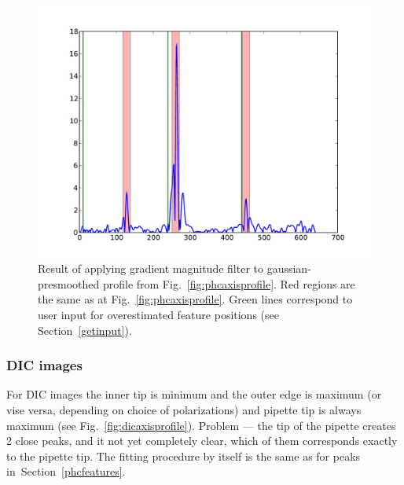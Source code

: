 \documentclass[a4paper,12pt]{article}
\begin{document}
\begin{figure}%
\includegraphics[width=\columnwidth]{figs/phcprofilegrad.pdf}%
\caption{Result of applying gradient magnitude filter to gaussian-presmoothed profile from Fig.~\ref{fig:phcaxisprofile}. Red regions are the same as at Fig.~\ref{fig:phcaxisprofile}. Green lines correspond to user input for overestimated feature positions (see Section~\ref{getinput}).}%
\label{fig:phcprofilegrad}%
\end{figure}

\subsubsection{DIC images}\label{dicfeatures}

For DIC images the inner tip is minimum and the outer edge is maximum (or vise versa, depending on choice of polarizations) and pipette tip is always maximum (see Fig.~\ref{fig:dicaxisprofile}). Problem --- the tip of the pipette creates 2 close peaks, and it not yet completely clear, which of them corresponds exactly to the pipette tip. The fitting procedure by itself is the same as for peaks in~Section~\ref{phcfeatures}.
\end{document}
